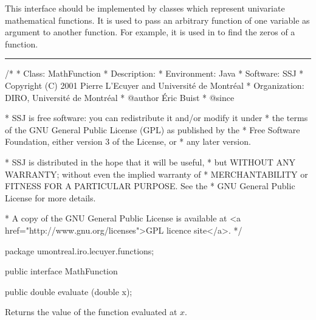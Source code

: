 
This interface should be implemented by classes which represent univariate 
mathematical functions. It is used to pass an arbitrary function of one 
variable as argument to another function. For example, it is used
in  to find
 the zeros of a function.

\bigskip\hrule\bigskip

\begin{code}
\begin{hide}
/*
 * Class:        MathFunction
 * Description:  
 * Environment:  Java
 * Software:     SSJ 
 * Copyright (C) 2001  Pierre L'Ecuyer and Université de Montréal
 * Organization: DIRO, Université de Montréal
 * @author       Éric Buist
 * @since

 * SSJ is free software: you can redistribute it and/or modify it under
 * the terms of the GNU General Public License (GPL) as published by the
 * Free Software Foundation, either version 3 of the License, or
 * any later version.

 * SSJ is distributed in the hope that it will be useful,
 * but WITHOUT ANY WARRANTY; without even the implied warranty of
 * MERCHANTABILITY or FITNESS FOR A PARTICULAR PURPOSE.  See the
 * GNU General Public License for more details.

 * A copy of the GNU General Public License is available at
   <a href="http://www.gnu.org/licenses">GPL licence site</a>.
 */
\end{hide}
package umontreal.iro.lecuyer.functions;

public interface MathFunction\begin{hide} {\end{hide}
\end{code}
\begin{code}

   public double evaluate (double x);
\end{code}
\begin{tabb}
   Returns the value of the function evaluated at $x$.
\end{tabb}
\begin{htmlonly}
\end{htmlonly}
\begin{code}\begin{hide}
}\end{hide}
\end{code}
